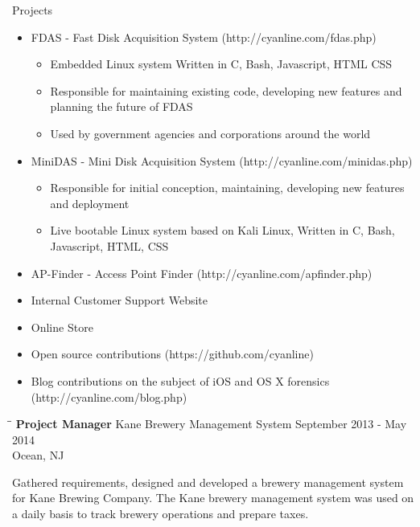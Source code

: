 \documentclass{res}
\begin{document}
\begin{resume}
    Projects
    \begin{itemize}
        \item FDAS - Fast Disk Acquisition System (http://cyanline.com/fdas.php)
        \begin{itemize}
            \item Embedded Linux system Written in C, Bash, Javascript, HTML CSS
            \item Responsible for maintaining existing code, developing new features and planning the future of FDAS
            \item Used by government agencies and corporations around the world
        \end{itemize}
        \item MiniDAS - Mini Disk Acquisition System (http://cyanline.com/minidas.php)
        \begin{itemize}
            \item Responsible for initial conception, maintaining, developing new features and deployment
            \item Live bootable Linux system based on Kali Linux, Written in C, Bash, Javascript, HTML, CSS
        \end{itemize}
        \item AP-Finder - Access Point Finder (http://cyanline.com/apfinder.php)
        \item Internal Customer Support Website
        \item Online Store
        \item Open source contributions (https://github.com/cyanline)
        \item Blog contributions on the subject of iOS and OS X forensics (http://cyanline.com/blog.php)
    \end{itemize}


   \begin{tabbing}
   \hspace{2.3in}\= \hspace{2.6in}\= \kill %
    {\bf Project Manager} \>Kane Brewery Management System     \>September 2013 - May 2014\\
                             \>Ocean, NJ
   \end{tabbing}\vspace{-20pt}      %
   Gathered requirements, designed and developed a brewery management system for Kane Brewing Company. The Kane brewery management system was used on a daily basis to track brewery operations and prepare taxes.


\end{resume}
\end{document}
